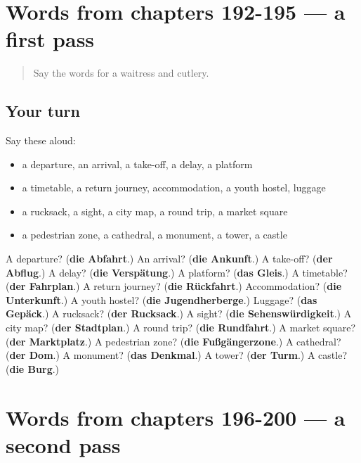 \section[(dialogue)]{Words from chapters 192-195 — a first pass}

\label{lesson:GE-R200-first-pass-words-from-chapters-192-195}



\begin{quote}
Say the words for a waitress and cutlery.
\end{quote}

\subsection*{Your turn}
Say these aloud:

\begin{itemize}
\raggedright
  \item a departure, an arrival, a take-off, a delay, a platform
  \item a timetable, a return journey, accommodation, a youth hostel, luggage
  \item a rucksack, a sight, a city map, a round trip, a market square
  \item a pedestrian zone, a cathedral, a monument, a tower, a castle
\end{itemize}

\begin{tcolorbox}[breakable,colback=teal!4,colframe=teal!35!black,title={Before you move on}]
A departure? (\textbf{die Abfahrt}.) An arrival? (\textbf{die Ankunft}.) A take-off? (\textbf{der Abflug}.) A delay? (\textbf{die Verspätung}.) A platform? (\textbf{das Gleis}.) A timetable? (\textbf{der Fahrplan}.) A return journey? (\textbf{die Rückfahrt}.) Accommodation? (\textbf{die Unterkunft}.) A youth hostel? (\textbf{die Jugendherberge}.) Luggage? (\textbf{das Gepäck}.) A rucksack? (\textbf{der Rucksack}.) A sight? (\textbf{die Sehenswürdigkeit}.) A city map? (\textbf{der Stadtplan}.) A round trip? (\textbf{die Rundfahrt}.) A market square? (\textbf{der Marktplatz}.) A pedestrian zone? (\textbf{die Fußgängerzone}.) A cathedral? (\textbf{der Dom}.) A monument? (\textbf{das Denkmal}.) A tower? (\textbf{der Turm}.) A castle? (\textbf{die Burg}.)
\end{tcolorbox}
\section[(dialogue)]{Words from chapters 196-200 — a second pass}

